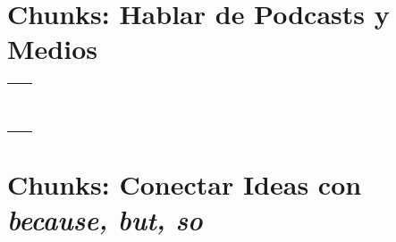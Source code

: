 \documentclass[12pt,a4paper]{article}
\begin{document}
\section{Chunks: Hablar de Podcasts y Medios}

\begin{cajachunk}
\begin{tabularx}{\textwidth}{@{} X l @{}}
\eng{The podcast was about...} & \esp{El podcast fue sobre...} \\
\eng{The main topic was...} & \esp{El tema principal fue...} \\
\eng{The speaker said that...} & \esp{El hablante dijo que...} \\
\eng{I found it interesting because...} & \esp{Me pareció interesante porque...} \\
\eng{The part I liked the most was...} & \esp{La parte que más me gustó fue...} \\
\eng{I didn't understand the part about...} & \esp{No entendí la parte sobre...} \\
\eng{It reminded me of...} & \esp{Me recordó a...} \\
\eng{I learned that...} & \esp{Aprendí que...} \\
\eng{What do you think about...?} & \esp{¿Qué opinas sobre...?} \\
\eng{Do you agree with what the speaker said?} & \esp{¿Estás de acuerdo con lo que dijo?} \\
\end{tabularx}
\end{cajachunk}

\section{Chunks: Conectar Ideas con \textit{because, but, so}}
\end{document}
